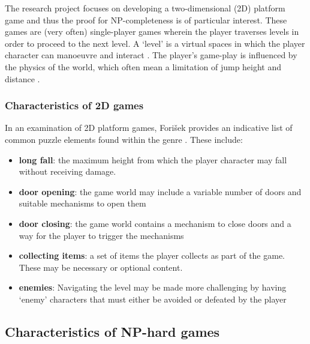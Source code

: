 \documentclass[11pt, a4paper, oneside]{report} %
\begin{document}
The research project focuses on developing a two-dimensional (2D) platform game
and thus the proof for NP-completeness is of particular interest. These games
are (very often) single-player games wherein the player traverses levels in
order to proceed to the next level. A `level' is a virtual spaces in which the
player character can manoeuvre and interact \cite{Burgun:2012}. The player's
game-play is influenced by the physics of the world, which often mean a
limitation of jump height and distance \cite{Burgun:2012}.

\subsubsection{Characteristics of 2D games}

In an examination of 2D platform games, Fori\v{s}ek provides an indicative list of
common puzzle elements found within the genre
\cite{Smith:2008:FAP:1401843.1401858,DBLP:conf/fun/Forisek10}. These include:

\begin{itemize}

  \item \textbf{long fall}: the maximum height from which the player character may fall without
                            receiving damage.

  \item \textbf{door opening}: the game world may include a variable number of doors and
                               suitable mechanisms to open them

  \item \textbf{door closing}: the game world contains a mechanism to close doors and a way for the
                               player to trigger the mechanisms

  \item \textbf{collecting items}: a set of items the player collects as part of the game. These may
                                   be necessary or optional content.

  \item \textbf{enemies}: Navigating the level may be made more challenging by having `enemy'
                          characters that must either be avoided or defeated by the player

\end{itemize}

\subsection{Characteristics of NP-hard games}
\end{document}
